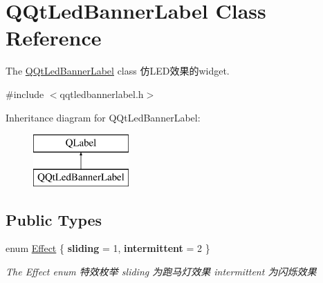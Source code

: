 \hypertarget{class_q_qt_led_banner_label}{}\section{Q\+Qt\+Led\+Banner\+Label Class Reference}
\label{class_q_qt_led_banner_label}


The \mbox{\hyperlink{class_q_qt_led_banner_label}{Q\+Qt\+Led\+Banner\+Label}} class 仿\+L\+E\+D效果的widget.  




{\ttfamily \#include $<$qqtledbannerlabel.\+h$>$}

Inheritance diagram for Q\+Qt\+Led\+Banner\+Label\+:\begin{figure}[H]
\begin{center}
\leavevmode
\includegraphics[height=2.000000cm]{class_q_qt_led_banner_label}
\end{center}
\end{figure}
\subsection*{Public Types}
\begin{DoxyCompactItemize}
\item 
\mbox{\label{class_q_qt_led_banner_label_a8ea55a34d54e6fe09a74c5fd2d83e5dc}} 
enum \mbox{\hyperlink{class_q_qt_led_banner_label_a8ea55a34d54e6fe09a74c5fd2d83e5dc}{Effect}} \{ {\bfseries sliding} = 1, 
{\bfseries intermittent} = 2
 \}
\begin{DoxyCompactList}\small\item\em The Effect enum 特效枚举 sliding 为跑马灯效果 intermittent 为闪烁效果 \end{DoxyCompactList}\end{DoxyCompactItemize}
